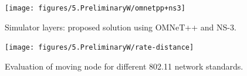 \begin{figure}[h!]
	\centering
	\texttt{[image: figures/5.PreliminaryW/omnetpp+ns3]}
	\caption{Simulator layers: proposed solution using OMNeT++ and NS-3.}
	\label{fig:5.omnetpp+ns3}
\end{figure}



\begin{figure}[h!]
	\centering
	\texttt{[image: figures/5.PreliminaryW/rate-distance]}
	\caption{Evaluation of moving node for different 802.11 network standards.}
	\label{fig:5.rate-distance}
\end{figure}

